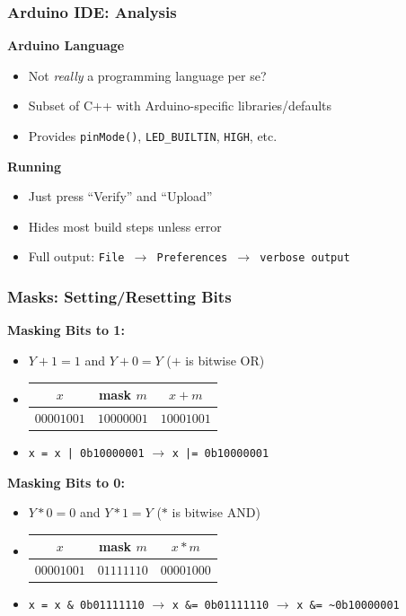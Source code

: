 \documentclass{beamer} \usetheme{Madrid}
\begin{document}
\begin{frame}
    \frametitle{Arduino IDE: Analysis}
    \vfill
    \textbf{Arduino Language}
    \begin{itemize}
        \item Not \emph{really} a programming language per se?
        \item Subset of C++ with Arduino-specific libraries/defaults
        \item Provides \texttt{pinMode()}, \texttt{LED\_BUILTIN}, \texttt{HIGH}, etc.
    \end{itemize}
    \vfill
    \textbf{Running}
    \begin{itemize}
        \item Just press ``Verify'' and ``Upload''
        \item Hides most build steps unless error
        \item Full output: \texttt{File $\rightarrow$ Preferences $\rightarrow$ verbose output}
    \end{itemize}
    \vfill
\end{frame}

\begin{frame}
    \frametitle{Masks: Setting/Resetting Bits}
    \vfill
    \begin{center} \textbf{Masking Bits to 1:} \end{center}
    \begin{itemize}
        \item $Y + 1 = 1$ and $Y + 0 = Y$ \hfill ($+$ is bitwise OR)
        \item
            \begin{tabular}{cc|c}
                $x$ & mask $m$ & $x + m$ \\
                \hline
                $00001001$ & $10000001$ & $10001001$ \\
            \end{tabular}
        \item \texttt{x = x | 0b10000001} $\rightarrow$ \texttt{x |= 0b10000001}
    \end{itemize}
    \vfill
    \begin{center} \textbf{Masking Bits to 0:} \end{center}
    \begin{itemize}
        \item $Y * 0 = 0$ and $Y * 1 = Y$ \hfill ($*$ is bitwise AND)
        \item
            \begin{tabular}{cc|c}
                $x$ & mask $m$ & $x * m$ \\
                \hline
                $00001001$ & $01111110$ & $00001000$ \\
            \end{tabular}
        \item \texttt{x = x \& 0b01111110} $\rightarrow$ \texttt{x \&= 0b01111110} $\rightarrow$ \texttt{x \&= \textasciitilde0b10000001}
    \end{itemize}
    \vfill
\end{frame}
\end{document}
